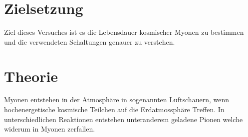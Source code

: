 \section{Zielsetzung}
    Ziel dieses Versuches ist es die Lebensdauer kosmischer Myonen zu bestimmen und die verwendeten Schaltungen genauer zu verstehen.

\section{Theorie}

    Myonen entstehen in der Atmosphäre in sogenannten Luftschauern, wenn hochenergetische kosmische Teilchen auf die Erdatmossphäre Treffen.
    In unterschiedlichen Reaktionen entstehen unteranderem geladene Pionen welche widerum in Myonen zerfallen.
    

       
  




